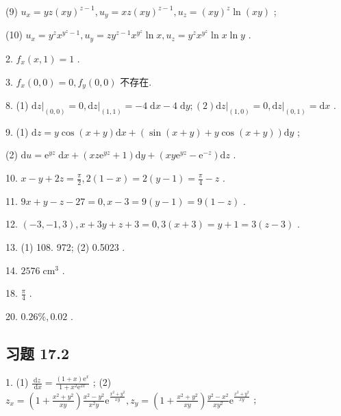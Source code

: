 (9) \({u}_{x} = {yz}{\left( xy\right) }^{z - 1},{u}_{y} = {xz}{\left( xy\right) }^{z - 1},{u}_{z} = {\left( xy\right) }^{z}\ln \left( {xy}\right)\) ;

(10) \({u}_{x} = {y}^{z}{x}^{{y}^{z} - 1},{u}_{y} = z{y}^{z - 1}{x}^{{y}^{z}}\ln x,{u}_{z} = {y}^{z}{x}^{{y}^{z}}\ln x\ln y\) .

2. \({f}_{x}\left( {x,1}\right)  = 1\) .

3. \({f}_{x}\left( {0,0}\right)  = 0,{f}_{y}\left( {0,0}\right)\) 不存在.

8. (1) \({\left. \mathrm{d}z\right| }_{\left( 0,0\right) } = 0,{\left. \mathrm{d}z\right| }_{\left( 1,1\right) } =  - 4\mathrm{\;d}x - 4\mathrm{\;d}y;\left( 2\right) {\left. \mathrm{d}z\right| }_{\left( 1,0\right) } = 0,{\left. \mathrm{d}z\right| }_{\left( 0,1\right) } = \mathrm{d}x\) .

9. (1) \(\mathrm{d}z = y\cos \left( {x + y}\right) \mathrm{d}x + \left( {\sin \left( {x + y}\right)  + y\cos \left( {x + y}\right) }\right) \mathrm{d}y\) ;

(2) \(\mathrm{d}u = {\mathrm{e}}^{yz}\mathrm{\;d}x + \left( {{xz}{\mathrm{e}}^{yz} + 1}\right) \mathrm{d}y + \left( {{xy}{\mathrm{e}}^{yz} - {\mathrm{e}}^{-z}}\right) \mathrm{d}z\) .

10. \(x - y + {2z} = \frac{\pi }{2},2\left( {1 - x}\right)  = 2\left( {y - 1}\right)  = \frac{\pi }{4} - z\) .

11. \({9x} + y - z - {27} = 0,x - 3 = 9\left( {y - 1}\right)  = 9\left( {1 - z}\right)\) .

12. \(\left( {-3, - 1,3}\right) ,x + {3y} + z + 3 = 0,3\left( {x + 3}\right)  = y + 1 = 3\left( {z - 3}\right)\) .

13. (1) 108. 972; (2) 0.5023 .

14. \({2576}{\mathrm{\;{cm}}}^{3}\) .

18. \(\frac{\pi }{4}\) .

20. \({0.26}\% ,{0.02}\) .

\subsection{习题 17.2}

1. (1) \(\frac{\mathrm{d}z}{\mathrm{\;d}x} = \frac{\left( {1 + x}\right) {\mathrm{e}}^{x}}{1 + {x}^{2}{\mathrm{e}}^{2x}}\) ; (2) \({z}_{x} = \left( {1 + \frac{{x}^{2} + {y}^{2}}{xy}}\right) \frac{{x}^{2} - {y}^{2}}{{x}^{2}y}{\mathrm{e}}^{\frac{{x}^{2} + {y}^{2}}{xy}},{z}_{y} = \left( {1 + \frac{{x}^{2} + {y}^{2}}{xy}}\right) \frac{{y}^{2} - {x}^{2}}{x{y}^{2}}{\mathrm{e}}^{\frac{{x}^{2} + {y}^{2}}{xy}}\) ;

